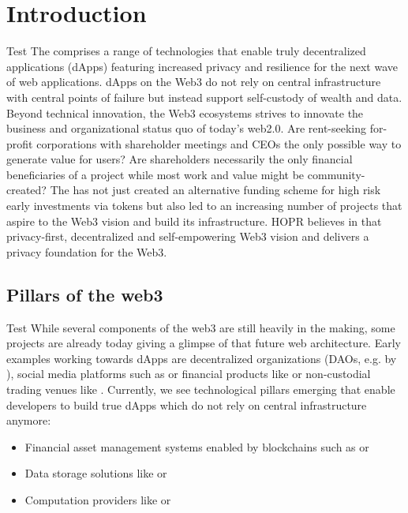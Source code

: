 \section{Introduction}

Test The  comprises a range of technologies that enable truly decentralized applications (dApps) featuring increased privacy and resilience for the next wave of web applications. dApps on the Web3 do not rely on central infrastructure with central points of failure but instead support self-custody of wealth and data. Beyond technical innovation, the Web3 ecosystems strives to innovate the business and organizational status quo of today's web2.0. Are rent-seeking for-profit corporations with shareholder meetings and CEOs the only possible way to generate value for users? Are shareholders necessarily the only financial beneficiaries of a project while most work and value might be community-created? The  has not just created an alternative funding scheme for high risk early investments via tokens but also led to an increasing number of projects that aspire to the Web3 vision and build its infrastructure. HOPR believes in that privacy-first, decentralized and self-empowering Web3 vision and delivers a privacy foundation for the Web3.

\subsection{Pillars of the web3}
Test While several components of the web3 are still heavily in the making, some projects are already today giving a glimpse of that future web architecture. Early examples working towards dApps are decentralized organizations (DAOs, e.g. by ), social media platforms such as  or financial products like  or non-custodial trading venues like . Currently, we see technological pillars emerging that enable developers to build true dApps which do not rely on central infrastructure anymore:
\begin{itemize}
    \item Financial asset management systems enabled by blockchains such as  or 
    \item Data storage solutions like  or 
    \item Computation providers like  or 
\end{itemize}

